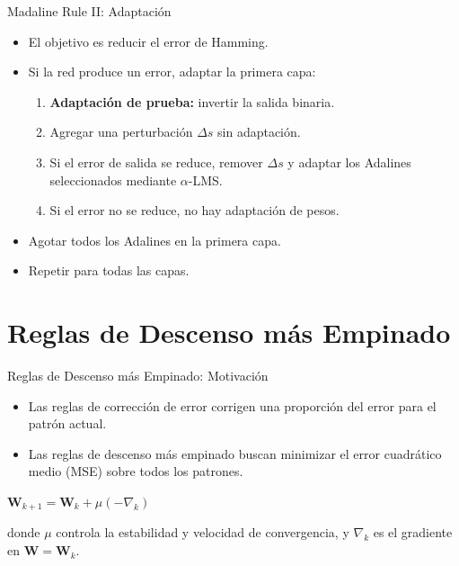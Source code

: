\documentclass[aspectratio=169,utf8,spanish]{beamer}
\begin{document}
\begin{frame}{Madaline Rule II: Adaptación}
  \begin{itemize}
    \item El objetivo es reducir el error de Hamming.
    \item Si la red produce un error, adaptar la primera capa:
    \begin{enumerate}
      \item \textbf{Adaptación de prueba:} invertir la salida binaria.
      \item Agregar una perturbación $\Delta s$ sin adaptación.
      \item Si el error de salida se reduce, remover $\Delta s$ y adaptar los Adalines seleccionados mediante $\alpha$-LMS.
      \item Si el error no se reduce, no hay adaptación de pesos.
    \end{enumerate}
    \item Agotar todos los Adalines en la primera capa.
    \item Repetir para todas las capas.
  \end{itemize}
\end{frame}

\section{Reglas de Descenso más Empinado}

\begin{frame}{Reglas de Descenso más Empinado: Motivación}
  \begin{itemize}
    \item Las reglas de corrección de error corrigen una proporción del error para el patrón actual.
    \item Las reglas de descenso más empinado buscan minimizar el error cuadrático medio (MSE) sobre todos los patrones.
  \end{itemize}

  \begin{center}
    $\mathbf{W}_{k+1} = \mathbf{W}_k + \mu(-\nabla_k)$
  \end{center}

  donde $\mu$ controla la estabilidad y velocidad de convergencia, y $\nabla_k$ es el gradiente en $\mathbf{W} = \mathbf{W}_k$.
\end{frame}
\end{document}

